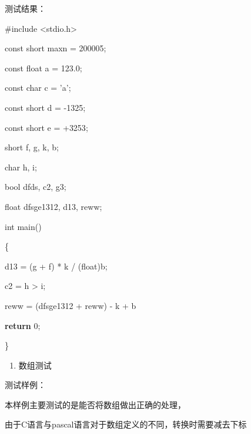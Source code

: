 \documentclass[]{ctexart}
\newenvironment{Shaded}{}{}
\newcommand{\CharTok}[1]{\textcolor[rgb]{0.25,0.44,0.63}{#1}}
\newcommand{\ControlFlowTok}[1]{\textcolor[rgb]{0.00,0.44,0.13}{\textbf{#1}}}
\newcommand{\DataTypeTok}[1]{\textcolor[rgb]{0.56,0.13,0.00}{#1}}
\newcommand{\DecValTok}[1]{\textcolor[rgb]{0.25,0.63,0.44}{#1}}
\newcommand{\FloatTok}[1]{\textcolor[rgb]{0.25,0.63,0.44}{#1}}
\newcommand{\ImportTok}[1]{#1}
\newcommand{\NormalTok}[1]{#1}
\newcommand{\PreprocessorTok}[1]{\textcolor[rgb]{0.74,0.48,0.00}{#1}}
\begin{document}
测试结果：

\begin{Shaded}
\begin{Highlighting}[]
\PreprocessorTok{#include }\ImportTok{<stdio.h>}\PreprocessorTok{
}


\DataTypeTok{const} \DataTypeTok{short}\NormalTok{ maxn = }\DecValTok{200005}\NormalTok{;
}
\DataTypeTok{const} \DataTypeTok{float}\NormalTok{ a = }\FloatTok{123.0}\NormalTok{;
}
\DataTypeTok{const} \DataTypeTok{char}\NormalTok{ c = }\CharTok{'a'}\NormalTok{;
}
\DataTypeTok{const} \DataTypeTok{short}\NormalTok{ d = }\DecValTok{-1325}\NormalTok{;
}
\DataTypeTok{const} \DataTypeTok{short}\NormalTok{ e = +}\DecValTok{3253}\NormalTok{;
}
\DataTypeTok{short}\NormalTok{ f, g, k, b;
}
\DataTypeTok{char}\NormalTok{ h, i;
}
\DataTypeTok{bool}\NormalTok{ dfds, c2, g3;
}
\DataTypeTok{float}\NormalTok{ dfsge1312, d13, reww;
}
\DataTypeTok{int}\NormalTok{ main()
}
\NormalTok{\{
}
\NormalTok{    d13 = (g + f) * k / (}\DataTypeTok{float}\NormalTok{)b;
}
\NormalTok{    c2 = h > i;
}
\NormalTok{    reww = (dfsge1312 + reww) - k + b % (f + g);
}
    \ControlFlowTok{return} \DecValTok{0}\NormalTok{;
}
\NormalTok{\}}
\end{Highlighting}
\end{Shaded}

\begin{enumerate}
\def\labelenumi{\arabic{enumi}.}
\item
  数组测试
\end{enumerate}

测试样例：

本样例主要测试的是能否将数组做出正确的处理，

由于C语言与pascal语言对于数组定义的不同，转换时需要减去下标
\end{document}
